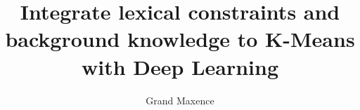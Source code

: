 \documentclass{article}
\begin{document}
\title{Integrate lexical constraints and background knowledge to K-Means with Deep Learning}
\author{Grand Maxence}

\maketitle







\newpage
\nocite{*}
\printbibliography
\end{document}
